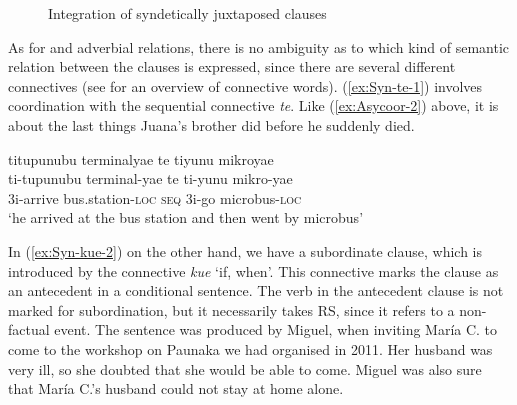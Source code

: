 \begin{figure}
\centering
{}
\caption{Integration of syndetically juxtaposed clauses}
\label{fig:IntegrationScaleSyndeticJuxtaposition}
\end{figure}


As for  and adverbial relations, there is no ambiguity as to which kind of semantic relation between the clauses is expressed, since there are several different connectives (see  for an overview of connective words). (\ref{ex:Syn-te-1}) involves coordination with the sequential connective \textit{te}. Like (\ref{ex:Asycoor-2}) above, it is about the last things Juana’s brother did before he suddenly died. 

\ea\label{ex:Syn-te-1}
\begingl
\glpreamble titupunubu terminalyae te tiyunu mikroyae\\
\gla ti-tupunubu terminal-yae te ti-yunu mikro-yae\\
\glb 3i-arrive bus.station-\textsc{loc} \textsc{seq} 3i-go microbus-\textsc{loc}\\
\glft ‘he arrived at the bus station and then went by microbus’
\endgl
\trailingcitation{[jxx-p120430l-2.402]}
\xe

In (\ref{ex:Syn-kue-2}) on the other hand, we have a subordinate clause, which is introduced by the connective \textit{kue} ‘if, when’. This connective marks the clause as an antecedent in a conditional sentence. The verb in the antecedent clause is not marked for subordination, but it necessarily takes  RS, since it refers to a non-factual event. The sentence was produced by Miguel, when inviting María C. to come to the workshop on Paunaka we had organised in 2011. Her husband was very ill, so she doubted that she would be able to come. Miguel was also sure that María C.’s husband could not stay at home alone.

